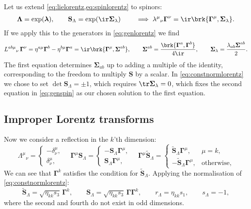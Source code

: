 \documentclass[11pt]{article}
\newcommand{\Gammab}{\boldsymbol{\Gamma}}
\renewcommand{\S}{\mathbf{S}}
\newcommand{\St}{\widetilde{\S}}
\newcommand{\Sigmab}{\boldsymbol{\Sigma}}
\newcommand{\lambdab}{\boldsymbol{\lambda}}
\newcommand{\Lambdab}{\boldsymbol{\Lambda}}
\begin{document}
Let us extend \cref{eq:lielorentz,eq:spinlorentz} to spinors:
%
\begin{equation}\label{eq:liespin}
\begin{aligned}
  \Lambdab = \exp(\lambdab),
  \qquad
  \S_\Lambda = \exp(\ir \Sigmab_\lambda)
  \qquad \implies
  \lambda^\mu{}_\nu \Gammab^\nu = \ir \brk{\Gammab^\mu, \Sigmab_\lambda}.
\end{aligned}
\end{equation}
%
If we apply this to the generators in \cref{eq:genlorentz} we find
%
\begin{equation}\label{eq:genspin}
  L^{ab\mu}{}_\nu\, \Gammab^\nu
    = \eta^{a\mu} \Gammab^b - \eta^{b\mu} \Gammab^a 
    = \ir \brk{\Gammab^\mu, \Sigmab^{ab}},
  \qquad
  \Sigmab^{ab} = \frac{\brk{\Gammab^a, \Gammab^b}}{4\ir},
  \qquad
  \Sigmab_\lambda = \frac{\lambda_{ab} \Sigmab^{ab}}{2}.
\end{equation}
%
The first equation determines \(\Sigmab_{ab}\) up to adding a multiple of the identity, corresponding to the freedom to multiply \(\S\) by a scalar.
In \cref{eq:constnormlorentz} we chose to set \(\det \S_\Lambda = \pm 1\), which requires \(\tr \Sigmab_\lambda = 0\), which fixes the second equation in \cref{eq:genspin} as our chosen solution to the first equation.



\subsection{Improper Lorentz transforms}\label{sec:reflectlorentz}

Now we consider a reflection in the \(k\)'th dimension:
%
\begin{equation*}
  \Lambda^\mu{}_\nu 
    = \begin{cases}
        -\delta^\mu_\nu, \\
        \delta^\mu_\nu,
      \end{cases}
  \quad
  \Gammab^\mu \S_\Lambda
  = \begin{cases}
      -\S_\Lambda \Gammab^\mu , \\
      \S_\Lambda \Gammab^\mu ,
    \end{cases}
  \quad
  \Gammab^\mu \St_\Lambda
  = \begin{cases}
      \St_\Lambda \Gammab^\mu, & \mu = k, \\
      -\St_\Lambda \Gammab^\mu, & \text{otherwise},
    \end{cases}
\end{equation*}
%
We can see that \(\Gammab^k\) satisfies the condition for \(\St_\Lambda\).
Applying the normalisation of \cref{eq:constnormlorentz}:
%
\begin{equation}\label{eq:reflect}
  \St_\Lambda = \sqrt{\eta_{kk}s_3}\, \Gammab^k, \qquad
  \S_\Lambda = \sqrt{\eta_{kk}s_3}\, \Gammab \Gammab^k, \qquad
  r_\Lambda = \eta_{kk} s_1, \qquad
  s_\Lambda = -1, 
\end{equation}
%
where the second and fourth do not exist in odd dimensions.
\end{document}

